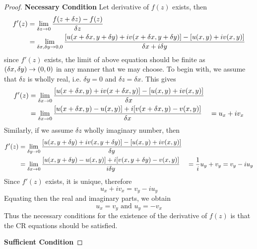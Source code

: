 \begin{proof}

\noindent 
\textbf{Necessary Condition}
Let derivative of $f(z)$ exists, then 
\begin{align*}
        f'(z) &= \lim_{\delta z \rightarrow 0} \frac{f(z+\delta z) - f(z)}{\delta z} \\
         &= \lim_{\delta x, \delta y \rightarrow 0,0} \frac{[u(x+\delta x, y+\delta y)+iv(x+\delta x, y+\delta y)]-[u(x, y)+iv(x, y)]  }{\delta x + i\delta y} 
\end{align*}
since $f'(z)$ exists, the limit of above equation should be finite as $(\delta x, \delta y) \rightarrow (0,0)$ in any manner that we may choose. To begin with, we assume that $\delta z$ is wholly real, i.e. $\delta y=0$ and $\delta z =\delta x$. This gives
\begin{align*}
f'(z) &= \lim_{\delta x \rightarrow 0} \frac{[u(x+\delta x, y)+iv(x+\delta x, y)]-[u(x, y)+iv(x, y)]  }{\delta x} \\
&= \lim_{\delta x \rightarrow 0} \frac{[u(x+\delta x, y)-u(x, y)]+i[v(x+\delta x, y) - v(x, y)]  }{\delta x}
&= u_x + i v_x
\end{align*}
Similarly, if we assume $\delta z$ wholly imaginary number, then
\begin{align*}
f'(z) &= \lim_{\delta y \rightarrow 0} \frac{[u(x, y+\delta y)+iv(x, y+\delta y)]-[u(x, y)+iv(x, y)]  }{\delta y} \\
&= \lim_{\delta x \rightarrow 0} \frac{[u(x, y+\delta y)-u(x, y)]+i[v(x, y+\delta y) - v(x, y)]  }{i\delta y}
&=\frac{1}{i}u_y + v_y = v_y - iu_y
\end{align*}
Since $f'(z)$ exists, it is unique, therefore
\[u_x + i v_x = v_y - iu_y\]
Equating then the real and imaginary parts, we obtain
\[u_x = v_y \text{ and } u_y = -v_x\]
Thus the necessary conditions for the existence of the derivative of $f(z)$ is that the CR equations should be satisfied.

\noindent 
\textbf{Sufficient Condition}


\end{proof}
